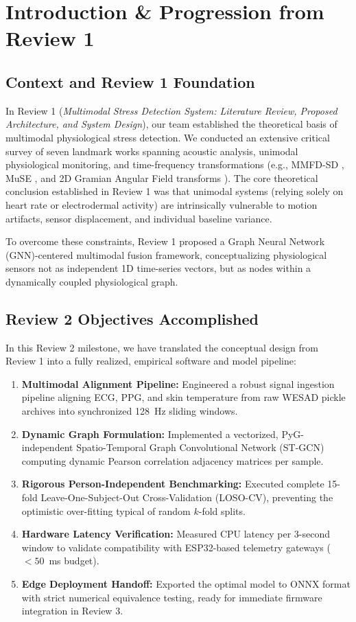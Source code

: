 \documentclass[conference]{IEEEtran}
\begin{document}
\section{Introduction \& Progression from Review 1}

\subsection{Context and Review 1 Foundation}
In Review 1 (\textit{Multimodal Stress Detection System: Literature Review, Proposed Architecture, and System Design}), our team established the theoretical basis of multimodal physiological stress detection. We conducted an extensive critical survey of seven landmark works spanning acoustic analysis, unimodal physiological monitoring, and time-frequency transformations (e.g., MMFD-SD \cite{xiang2025}, MuSE \cite{bara2020}, and 2D Gramian Angular Field transforms \cite{yang2025}). The core theoretical conclusion established in Review 1 was that unimodal systems (relying solely on heart rate or electrodermal activity) are intrinsically vulnerable to motion artifacts, sensor displacement, and individual baseline variance. 

To overcome these constraints, Review 1 proposed a Graph Neural Network (GNN)-centered multimodal fusion framework, conceptualizing physiological sensors not as independent 1D time-series vectors, but as nodes within a dynamically coupled physiological graph.

\subsection{Review 2 Objectives Accomplished}
In this Review 2 milestone, we have translated the conceptual design from Review 1 into a fully realized, empirical software and model pipeline:
\begin{enumerate}
    \item \textbf{Multimodal Alignment Pipeline:} Engineered a robust signal ingestion pipeline aligning ECG, PPG, and skin temperature from raw WESAD pickle archives into synchronized 128~Hz sliding windows.
    \item \textbf{Dynamic Graph Formulation:} Implemented a vectorized, PyG-independent Spatio-Temporal Graph Convolutional Network (ST-GCN) computing dynamic Pearson correlation adjacency matrices per sample.
    \item \textbf{Rigorous Person-Independent Benchmarking:} Executed complete 15-fold Leave-One-Subject-Out Cross-Validation (LOSO-CV), preventing the optimistic over-fitting typical of random $k$-fold splits.
    \item \textbf{Hardware Latency Verification:} Measured CPU latency per 3-second window to validate compatibility with ESP32-based telemetry gateways ($< 50$~ms budget).
    \item \textbf{Edge Deployment Handoff:} Exported the optimal model to ONNX format with strict numerical equivalence testing, ready for immediate firmware integration in Review 3.
\end{enumerate}
\end{document}
